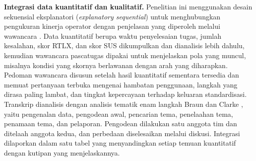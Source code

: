 \textbf{Integrasi data kuantitatif dan kualitatif.} Penelitian ini menggunakan desain sekuensial eksplanatori (\textit{explanatory sequential}) untuk menghubungkan pengukuran kinerja operator dengan penjelasan yang diperoleh melalui wawancara \cite{storey2025mixed}. Data kuantitatif berupa waktu penyelesaian tugas, jumlah kesalahan, skor RTLX, dan skor SUS dikumpulkan dan dianalisis lebih dahulu, kemudian wawancara pascatugas dipakai untuk menjelaskan pola yang muncul, misalnya kondisi yang skornya berlawanan dengan arah yang diharapkan. Pedoman wawancara disusun setelah hasil kuantitatif sementara tersedia dan memuat pertanyaan terbuka mengenai hambatan penggunaan, langkah yang dirasa paling lambat, dan tingkat kepercayaan terhadap keluaran standardisasi. Transkrip dianalisis dengan analisis tematik enam langkah Braun dan Clarke \cite{braun2006thematic}, yaitu pengenalan data, pengodean awal, pencarian tema, penelaahan tema, penamaan tema, dan pelaporan. Pengodean dilakukan satu anggota tim dan ditelaah anggota kedua, dan perbedaan diselesaikan melalui diskusi. Integrasi dilaporkan dalam satu tabel yang menyandingkan setiap temuan kuantitatif dengan kutipan yang menjelaskannya.

